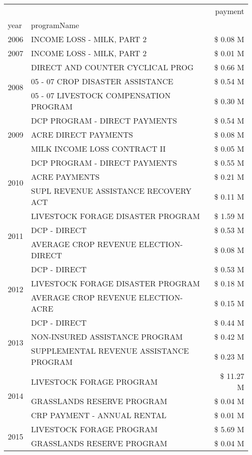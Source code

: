 \begin{tabular}{llr}
\toprule
 &  & payment \\
year & programName &  \\
\midrule
2006 & INCOME LOSS - MILK, PART 2 & \$ 0.08 M \\
\cline{1-3}
2007 & INCOME LOSS - MILK, PART 2 & \$ 0.01 M \\
\cline{1-3}
\multirow[t]{3}{*}{2008} & DIRECT AND COUNTER CYCLICAL PROG & \$ 0.66 M \\
 & 05 - 07 CROP DISASTER ASSISTANCE & \$ 0.54 M \\
 & 05 - 07 LIVESTOCK COMPENSATION PROGRAM & \$ 0.30 M \\
\cline{1-3}
\multirow[t]{3}{*}{2009} & DCP PROGRAM - DIRECT PAYMENTS & \$ 0.54 M \\
 & ACRE DIRECT PAYMENTS & \$ 0.08 M \\
 & MILK INCOME LOSS CONTRACT II & \$ 0.05 M \\
\cline{1-3}
\multirow[t]{3}{*}{2010} & DCP PROGRAM - DIRECT PAYMENTS & \$ 0.55 M \\
 & ACRE PAYMENTS & \$ 0.21 M \\
 & SUPL REVENUE ASSISTANCE RECOVERY ACT & \$ 0.11 M \\
\cline{1-3}
\multirow[t]{3}{*}{2011} & LIVESTOCK FORAGE DISASTER PROGRAM & \$ 1.59 M \\
 & DCP - DIRECT & \$ 0.53 M \\
 & AVERAGE CROP REVENUE ELECTION-DIRECT & \$ 0.08 M \\
\cline{1-3}
\multirow[t]{3}{*}{2012} & DCP - DIRECT & \$ 0.53 M \\
 & LIVESTOCK FORAGE DISASTER PROGRAM & \$ 0.18 M \\
 & AVERAGE CROP REVENUE ELECTION-ACRE & \$ 0.15 M \\
\cline{1-3}
\multirow[t]{3}{*}{2013} & DCP - DIRECT & \$ 0.44 M \\
 & NON-INSURED ASSISTANCE PROGRAM & \$ 0.42 M \\
 & SUPPLEMENTAL REVENUE ASSISTANCE PROGRAM & \$ 0.23 M \\
\cline{1-3}
\multirow[t]{3}{*}{2014} & LIVESTOCK FORAGE PROGRAM & \$ 11.27 M \\
 & GRASSLANDS RESERVE PROGRAM & \$ 0.04 M \\
 & CRP PAYMENT - ANNUAL RENTAL & \$ 0.01 M \\
\cline{1-3}
\multirow[t]{3}{*}{2015} & LIVESTOCK FORAGE PROGRAM & \$ 5.69 M \\
 & GRASSLANDS RESERVE PROGRAM & \$ 0.04 M \\

\end{tabular}
